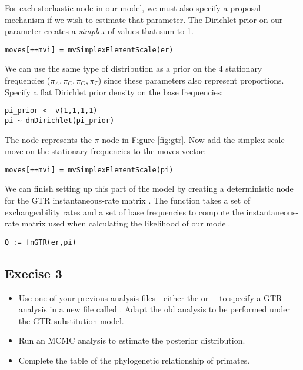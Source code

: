 For each stochastic node in our model, we must also specify a proposal mechanism if we wish to estimate that parameter. 
The Dirichlet prior on our parameter  creates a \href{http://en.wikipedia.org/wiki/Simplex}{\textit{simplex}} of values that sum to 1. 

{\tt\small \begin{snugshade*}
\begin{lstlisting}
moves[++mvi] = mvSimplexElementScale(er) 
\end{lstlisting}
\end{snugshade*}}

We can use the same type of distribution as a prior on the 4 stationary frequencies ($\pi_A, \pi_C, \pi_G, \pi_T$) since these parameters also represent proportions. 
Specify a flat Dirichlet prior density on the base frequencies:
{\tt \begin{snugshade*}
\begin{lstlisting}
pi_prior <- v(1,1,1,1) 
pi ~ dnDirichlet(pi_prior)
\end{lstlisting}
\end{snugshade*}}

The node  represents the $\pi$ node in Figure \ref{fig:gtr}.
Now add the simplex scale move on the stationary frequencies to the moves vector:
{\tt \small \begin{snugshade*}
\begin{lstlisting}
moves[++mvi] = mvSimplexElementScale(pi)  
\end{lstlisting}
\end{snugshade*}}

We can finish setting up this part of the model by creating a deterministic node for the GTR instantaneous-rate matrix . 
The  function takes a set of exchangeability rates and a set of base frequencies to compute the instantaneous-rate matrix used when calculating the likelihood of our model.
{\tt \begin{snugshade*}
\begin{lstlisting}
Q := fnGTR(er,pi)
\end{lstlisting}
\end{snugshade*}}




\subsection{Execise 3}

\begin{itemize}
\item Use one of your previous analysis files---either the  or ---to specify a GTR analysis in a new file called .
	Adapt the old analysis to be performed under the GTR substitution model. 
\item Run an MCMC analysis to estimate the posterior distribution.
\item Complete the table of the phylogenetic relationship of primates.
\end{itemize}







